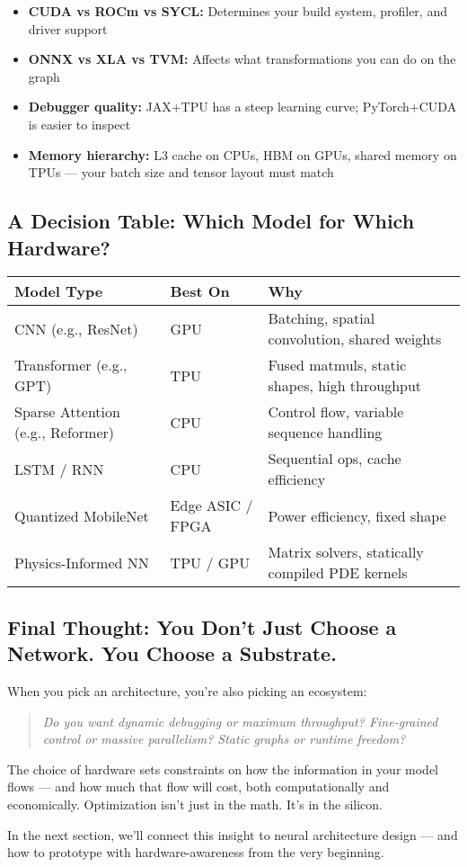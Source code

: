 \begin{itemize}
    \item \textbf{CUDA vs ROCm vs SYCL:} Determines your build system, profiler, and driver support
    \item \textbf{ONNX vs XLA vs TVM:} Affects what transformations you can do on the graph
    \item \textbf{Debugger quality:} JAX+TPU has a steep learning curve; PyTorch+CUDA is easier to inspect
    \item \textbf{Memory hierarchy:} L3 cache on CPUs, HBM on GPUs, shared memory on TPUs — your batch size and tensor layout must match
\end{itemize}

\subsection{A Decision Table: Which Model for Which Hardware?}

\begin{center}
\begin{tabular}{|l|l|l|}
\hline
\textbf{Model Type} & \textbf{Best On} & \textbf{Why} \\
\hline
CNN (e.g., ResNet) & GPU & Batching, spatial convolution, shared weights \\
\hline
Transformer (e.g., GPT) & TPU & Fused matmuls, static shapes, high throughput \\
\hline
Sparse Attention (e.g., Reformer) & CPU & Control flow, variable sequence handling \\
\hline
LSTM / RNN & CPU & Sequential ops, cache efficiency \\
\hline
Quantized MobileNet & Edge ASIC / FPGA & Power efficiency, fixed shape \\
\hline
Physics-Informed NN & TPU / GPU & Matrix solvers, statically compiled PDE kernels \\
\hline
\end{tabular}
\end{center}

\subsection{Final Thought: You Don’t Just Choose a Network. You Choose a Substrate.}

When you pick an architecture, you're also picking an ecosystem:

\begin{quote}
\textit{Do you want dynamic debugging or maximum throughput? Fine-grained control or massive parallelism? Static graphs or runtime freedom?}
\end{quote}

The choice of hardware sets constraints on how the information in your model flows — and how much that flow will cost, both computationally and economically. Optimization isn't just in the math. It’s in the silicon.

\vspace{1em}
In the next section, we’ll connect this insight to neural architecture design — and how to prototype with hardware-awareness from the very beginning.
